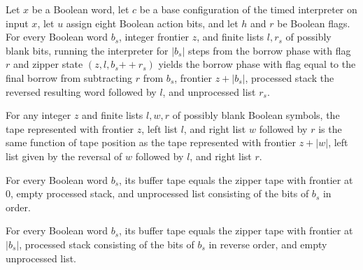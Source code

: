 \begin{lemma}
\label{Turing.timed_borrow_run}
\leanok
{}
Let $x$ be a Boolean word, let $c$ be a base configuration of the timed interpreter on
input $x$, let $u$ assign eight Boolean action bits, and let $h$ and $r$ be Boolean
flags. For every Boolean word $b_s$, integer frontier $z$, and finite lists $l,r_s$ of
possibly blank bits, running the interpreter for $|b_s|$ steps from the borrow phase
with flag $r$ and zipper state $(z,l,b_s\mathbin{+\!\!+}r_s)$ yields the borrow phase with
flag equal to the final borrow from subtracting $r$ from $b_s$, frontier $z+|b_s|$,
processed stack the reversed resulting word followed by $l$, and unprocessed list $r_s$.
\end{lemma}

\begin{lemma}
\label{Turing.timed_sweep_shift}
\leanok
{}
For any integer $z$ and finite lists $l,w,r$ of possibly blank Boolean symbols, the tape
represented with frontier $z$, left list $l$, and right list $w$ followed by $r$ is the
same function of tape position as the tape represented with frontier $z+|w|$, left list
given by the reversal of $w$ followed by $l$, and right list $r$.
\end{lemma}

\begin{lemma}
\label{Turing.timed_buffer_zipper}
\leanok
{}
For every Boolean word $b_s$, its buffer tape equals the zipper tape with frontier at
$0$, empty processed stack, and unprocessed list consisting of the bits of $b_s$ in
order.
\end{lemma}

\begin{lemma}
\label{Turing.timed_buffer_zipper_end}
\leanok
{}
For every Boolean word $b_s$, its buffer tape equals the zipper tape with frontier at
$|b_s|$, processed stack consisting of the bits of $b_s$ in reverse order, and empty
unprocessed list.
\end{lemma}

